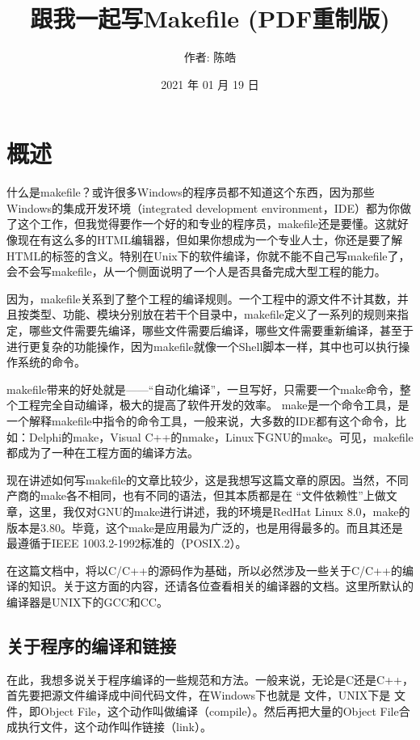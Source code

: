 \documentclass[a4paper,10pt]{sphinxmanual}
\title{跟我一起写Makefile (PDF重制版)}
\date{2021 年 01 月 19 日}
\author{作者: 陈皓}
\begin{document}
\pagestyle{empty}
\maketitle
\pagestyle{plain}
\sphinxtableofcontents
\pagestyle{normal}
\label{\detokenize{index::doc}}



\chapter{概述}
\label{\detokenize{overview:id1}}\label{\detokenize{overview::doc}}
什么是makefile？或许很多Windows的程序员都不知道这个东西，因为那些Windows的集成开发环境（integrated development environment，IDE）都为你做了这个工作，但我觉得要作一个好的和专业的程序员，makefile还是要懂。这就好像现在有这么多的HTML编辑器，但如果你想成为一个专业人士，你还是要了解HTML的标签的含义。特别在Unix下的软件编译，你就不能不自己写makefile了，会不会写makefile，从一个侧面说明了一个人是否具备完成大型工程的能力。

因为，makefile关系到了整个工程的编译规则。一个工程中的源文件不计其数，并且按类型、功能、模块分别放在若干个目录中，makefile定义了一系列的规则来指定，哪些文件需要先编译，哪些文件需要后编译，哪些文件需要重新编译，甚至于进行更复杂的功能操作，因为makefile就像一个Shell脚本一样，其中也可以执行操作系统的命令。

makefile带来的好处就是——“自动化编译”，一旦写好，只需要一个make命令，整个工程完全自动编译，极大的提高了软件开发的效率。 make是一个命令工具，是一个解释makefile中指令的命令工具，一般来说，大多数的IDE都有这个命令，比如：Delphi的make，Visual C++的nmake，Linux下GNU的make。可见，makefile都成为了一种在工程方面的编译方法。

现在讲述如何写makefile的文章比较少，这是我想写这篇文章的原因。当然，不同产商的make各不相同，也有不同的语法，但其本质都是在 “文件依赖性”上做文章，这里，我仅对GNU的make进行讲述，我的环境是RedHat Linux 8.0，make的版本是3.80。毕竟，这个make是应用最为广泛的，也是用得最多的。而且其还是最遵循于IEEE 1003.2-1992标准的（POSIX.2）。

在这篇文档中，将以C/C++的源码作为基础，所以必然涉及一些关于C/C++的编译的知识。关于这方面的内容，还请各位查看相关的编译器的文档。这里所默认的编译器是UNIX下的GCC和CC。


\section{关于程序的编译和链接}
\label{\detokenize{overview:id2}}
在此，我想多说关于程序编译的一些规范和方法。一般来说，无论是C还是C++，首先要把源文件编译成中间代码文件，在Windows下也就是  文件，UNIX下是  文件，即Object File，这个动作叫做编译（compile）。然后再把大量的Object File合成执行文件，这个动作叫作链接（link）。
\end{document}
